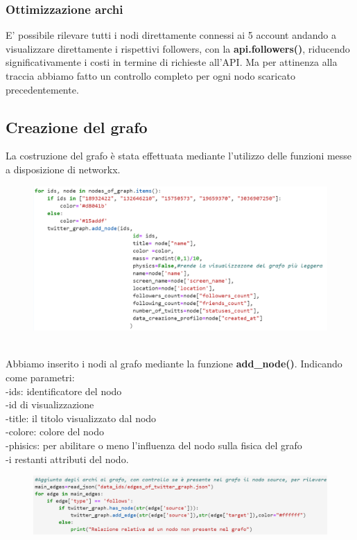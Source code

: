 \documentclass[a4paper,11pt]{report}
\begin{document}
\subsubsection{Ottimizzazione archi}
E' possibile rilevare tutti i nodi direttamente connessi ai 5 account andando a visualizzare direttamente i rispettivi followers, con la \textbf{api.followers()}, riducendo significativamente i costi in termine di richieste all'API. Ma per attinenza alla traccia abbiamo fatto un controllo completo per ogni nodo scaricato precedentemente.
\subsection{Creazione del grafo}
La costruzione del grafo è stata effettuata mediante l'utilizzo delle funzioni messe a disposizione di networkx. 
\begin{figure}[h]
	\centering
	\includegraphics[width=0.8\linewidth]{aggiunta_nodi}
	\label{fig:aggiuntanodi}
\end{figure}
\\
Abbiamo inserito i nodi al grafo mediante la funzione \textbf{add\_node()}. Indicando come parametri:\\
-ids: identificatore del nodo\\
-id di visualizzazione\\
-title: il titolo visualizzato dal nodo\\
-colore: colore del nodo\\
-phisics: per abilitare o meno l'influenza del nodo sulla fisica del grafo\\
-i restanti attributi del nodo.
\newline

\begin{figure}[h]
	\centering
	\includegraphics[width=0.9\linewidth]{aggiunta_archi}
	\label{fig:aggiuntaarchi}
\end{figure}
\end{document}
